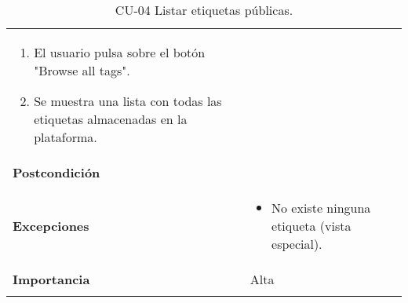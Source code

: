 \begin{longtable}[]{@{}ll@{}}
\begin{minipage}[t]{0.72\columnwidth}
\begin{enumerate}
\def\labelenumi{\arabic{enumi}.}
\tightlist
\item
  El usuario pulsa sobre el botón "Browse all tags".
\item
  Se muestra una lista con todas las etiquetas almacenadas en la
  plataforma.
\end{enumerate}\strut
\end{minipage}\tabularnewline
\begin{minipage}[t]{0.22\columnwidth}\raggedright
\textbf{Postcondición}\strut
\end{minipage} & \begin{minipage}[t]{0.72\columnwidth}\raggedright
\strut
\end{minipage}\tabularnewline
\begin{minipage}[t]{0.22\columnwidth}\raggedright
\textbf{Excepciones}\strut
\end{minipage} & \begin{minipage}[t]{0.72\columnwidth}\raggedright
\begin{itemize}
\tightlist
\item
  No existe ninguna etiqueta (vista especial).
\end{itemize}\strut
\end{minipage}\tabularnewline
\begin{minipage}[t]{0.22\columnwidth}\raggedright
\textbf{Importancia}\strut
\end{minipage} & \begin{minipage}[t]{0.72\columnwidth}\raggedright
Alta\strut
\end{minipage}\tabularnewline
\bottomrule
\caption{CU-04 Listar etiquetas públicas.}
\end{longtable}

